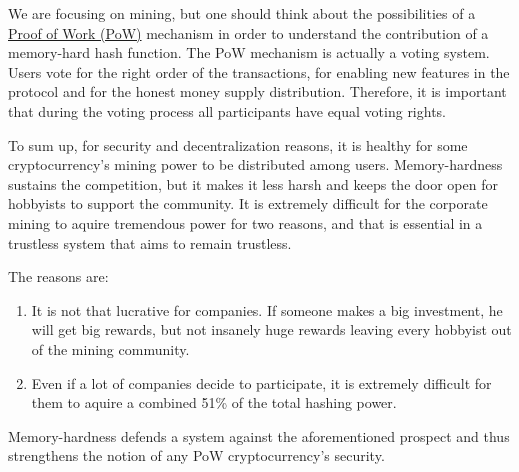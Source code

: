 We are focusing on mining, but one should think about the possibilities of a \hyperref[proofOfWork]{Proof of Work (PoW)} mechanism in order to understand the contribution of a memory-hard hash function. The PoW mechanism is actually a voting system. Users vote for the right order of the transactions, for enabling new features in the protocol and for the honest money supply distribution. Therefore, it is important that during the voting process all participants have equal voting rights.

To sum up, for security and decentralization reasons, it is healthy for some cryptocurrency's mining power to be distributed among users. Memory-hardness sustains the competition, but it makes it less harsh and keeps the door open for hobbyists to support the community. It is extremely difficult for the corporate mining to aquire tremendous power for two reasons, and that is essential in a trustless system that aims to remain trustless.

\noindent The reasons are:
\begin{enumerate}[label=(\greek*)]
  \item It is not that lucrative for companies. If someone makes a big investment, he will get big rewards, but not insanely huge rewards leaving every hobbyist out of the mining community.
  \item Even if a lot of companies decide to participate, it is extremely difficult for them to aquire a combined 51\% of the total hashing power.
\end{enumerate}

Memory-hardness defends a system against the aforementioned prospect and thus strengthens the notion of any PoW cryptocurrency's security.
